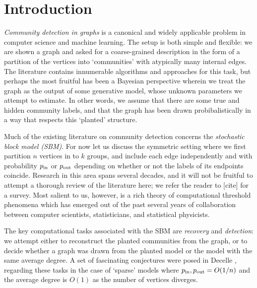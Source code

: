 \section{Introduction}



\emph{Community detection in graphs} is a canonical and widely applicable problem in computer science and machine learning. The setup is both simple and flexible: we are shown a graph and asked for a coarse-grained description in the form of a partition of the vertices into `communities' with atypically many internal edges. The literature contains innumerable algorithms and approaches for this task, but perhaps the most fruitful has been a Bayesian perspective wherein we treat the graph as the output of some generative model, whose unknown parameters we attempt to estimate. In other words, we assume that there are some true and hidden community labels, and that the graph has been drawn probibalistically in a way that respects this `planted' structure.

Much of the existing literature on community detection concerns the \emph{stochastic block model (SBM)}. For now let us discuss the symmetric setting where we first partition $n$ vertices in to $k$ groups, and include each edge independently and with probability $p_{\textup{in}}$ or $p_{\textup{out}}$ depending on whether or not the labels of its endpoints coincide. Research in this area spans several decades, and it will not be fruitful to attempt a thorough review of the literature here; we refer the reader to [cite] for a survey. Most salient to us, however, is a rich theory of computational threshold phenomena which has emerged out of the past several years of collaboration between computer scientists, statisticians, and statistical physicists.

The key computational tasks associated with the SBM are \emph{recovery} and \emph{detection}: we attempt either to reconstruct the planted communities from the graph, or to decide whether a graph was drawn from the planted model or the \ER model with the same average degree. A set of fascinating conjectures were posed in Decelle \etal \cite{decelle2011inference}, regarding these tasks in the case of `sparse' models where $p_{\textup{in}},p_{\textup{out}} = O(1/n)$ and the average degree is $O(1)$ as the number of vertices diverges. 

